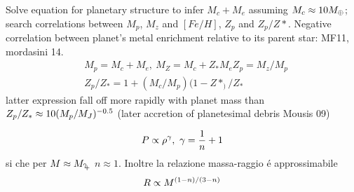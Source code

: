 \begin{workout}
	Solve equation for planetary structure to infer $M_c+M_e$ assuming $M_c\approx10M_{\oplus}{}$; search correlations between $M_p$, $M_z$ and $[Fe/H]$, $Z_p$ and $Z_p/Z*$.
	Negative correlation between planet's metal enrichment relative to its parent star: MF11, mordasini 14.
	\begin{align*}
	&M_p=M_c+M_e,\ M_Z=M_c+Z_*M_eZ_p=M_z/M_p\\
	&Z_p/Z_*=1+(M_c/M_p)(1-Z*_)/Z_*
	\end{align*}
	latter expression fall off more rapidly with planet mass  than $Z_p/Z_*\approx10(M_p/M_J)^{-0.5}$ (later accretion of planetesimal debris Mousis 09)
\end{workout}

\begin{errata}
	\begin{equation}
	P\propto\rho\expy{\gamma},\ \gamma=\frac{1}{n}+1
	\end{equation}
	si che per $M\approx\mjupiter$ $n\approx1$.
	Inoltre la relazione massa-raggio  \'e approssimabile
	\begin{equation}
	R\propto M^{(1-n)/(3-n)}
	\end{equation}
\end{errata}



\begin{workout}

\end{workout}




